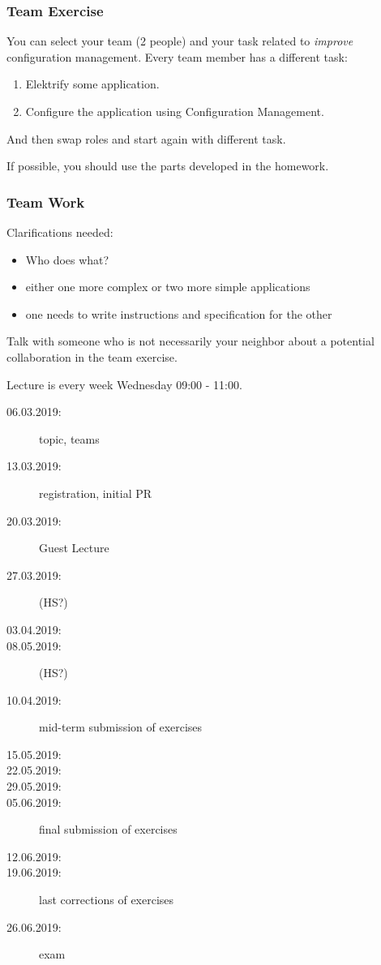 \begin{frame}
	\frametitle{Team Exercise}
	You can select your team (2 people) and your task related to \emph{improve} configuration management.
	Every team member has a different task:

	\begin{enumerate}
		\item Elektrify some application.
		\item Configure the application using Configuration Management.
	\end{enumerate}

	\vspace{0.5cm}
	And then swap roles and start again with different task.

	\vspace{0.5cm}
	If possible, you should use the parts developed in the homework.
\end{frame}

\begin{frame}
	\frametitle{Team Work}


	Clarifications needed:
	\begin{itemize}
	\item Who does what?
	\item either one more complex or two more simple applications
	\item one needs to write instructions and specification for the other
	\end{itemize}
\end{frame}

\begin{assignment}
	\begin{task}
	Talk with someone who is not necessarily your neighbor about a potential collaboration in the team exercise.
	\end{task}
\end{assignment}

\begin{frame}
	Lecture is every week Wednesday 09:00 - 11:00.

	\begin{description}
		\item[06.03.2019:] topic, teams
		\item[13.03.2019:] registration, initial PR
		\item[20.03.2019:] Guest Lecture
		\item[27.03.2019:] (HS?)
		\item[03.04.2019:]
		\item[08.05.2019:] (HS?)
		\item[10.04.2019:] mid-term submission of exercises
		\item[15.05.2019:]
		\item[22.05.2019:]
		\item[29.05.2019:]
		\item[05.06.2019:] final submission of exercises
		\item[12.06.2019:]
		\item[19.06.2019:] last corrections of exercises
		\item[26.06.2019:] exam
	\end{description}
\end{frame}


